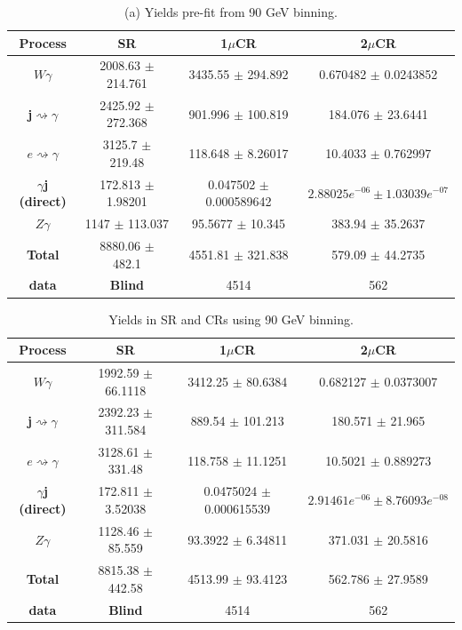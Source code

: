 \begin{table}[ht!]
    \centering
    \begin{tabular}{|c|c|c|c|}
        \hline
        \textbf{Process} & \textbf{SR} & \textbf{1$\mu$CR} & \textbf{2$\mu$CR} \\
        \hline
        \textbf{$W\gamma$} &2008.63 $\pm$ 214.761 & 3435.55 $\pm$ 294.892 & 0.670482 $\pm$ 0.0243852 \\ \hline
        \textbf{j$\rightsquigarrow\gamma$}   &2425.92 $\pm$ 272.368 & 901.996 $\pm$ 100.819 & 184.076 $\pm$ 23.6441 \\ \hline
        \textbf{$e\rightsquigarrow\gamma$}   &3125.7 $\pm$ 219.48 & 118.648 $\pm$ 8.26017 & 10.4033 $\pm$ 0.762997\\ \hline
        \textbf{$\gamma$j (direct)}   &172.813 $\pm$ 1.98201 & 0.047502 $\pm$ 0.000589642 & ${2.88025e^{-06} \pm 1.03039e^{-07}}$ \\ \hline
        \textbf{$Z\gamma$}   &1147 $\pm$ 113.037 & 95.5677 $\pm$ 10.345 & 383.94 $\pm$ 35.2637 \\ \hline
        \textbf{Total}  & 8880.06 $\pm$ 482.1 & 4551.81 $\pm$ 321.838 & 579.09 $\pm$ 44.2735 \\ \hline
        \textbf{data}  & \textbf{Blind} &4514 & 562 \\ \hline
        \end{tabular}
        \caption*{(a) Yields pre-fit from 90 GeV binning.}
\end{table}

\begin{table}[!ht]
        \centering 
        \begin{tabular}{|c| c | c | c |}
        \hline
        \textbf{Process} & \textbf{SR} & \textbf{1$\mu$CR} & \textbf{2$\mu$CR}  \\
        \hline
        \textbf{$W\gamma$} &1992.59 $\pm$ 66.1118 & 3412.25 $\pm$ 80.6384 & 0.682127 $\pm$ 0.0373007 \\ \hline
        \textbf{j$\rightsquigarrow\gamma$}   & 2392.23 $\pm$ 311.584 & 889.54 $\pm$ 101.213 & 180.571 $\pm$ 21.965 \\ \hline
        \textbf{$e\rightsquigarrow\gamma$}   & 3128.61 $\pm$ 331.48 & 118.758 $\pm$ 11.1251 & 10.5021 $\pm$ 0.889273 \\ \hline
        \textbf{$\gamma$j (direct)}   & 172.811 $\pm$ 3.52038 & 0.0475024 $\pm$ 0.000615539 & ${2.91461e^{-06} \pm 8.76093e^{-08}}$ \\ \hline
        \textbf{$Z\gamma$}   &1128.46 $\pm$ 85.559 & 93.3922 $\pm$ 6.34811 & 371.031 $\pm$ 20.5816 \\ \hline
        \textbf{Total}  & 8815.38 $\pm$ 442.58 & 4513.99 $\pm$ 93.4123 & 562.786 $\pm$ 27.9589 \\ \hline
        \textbf{data}  & \textbf{Blind} &4514 & 562 \\ 
        \hline
        \end{tabular}
        \caption*{(b) Yields post-fit from 90 GeV binning.}
        \caption{Yields in SR and CRs using 90 GeV binning.}
\label{tab:yield_90GeV}
\end{table}


